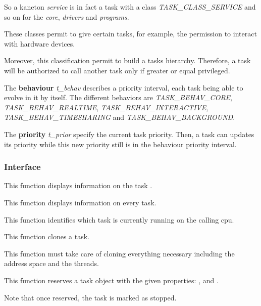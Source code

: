 So a kaneton \textit{service} is in fact a task with a class
\textit{TASK\_CLASS\_SERVICE} and so on for the \textit{core},
\textit{drivers} and \textit{programs}.

These classes permit to give certain tasks, for example, the permission
to interact with hardware devices.

Moreover, this classification permit to build a tasks hierarchy.
Therefore, a task will be authorized to call another task only if
greater or equal privileged.


The \textbf{behaviour} \textit{t\_behav} describes a priority
interval, each task being able to evolve in it by itself. The different
behaviors are \textit{TASK\_BEHAV\_CORE}, \textit{TASK\_BEHAV\_REALTIME},
\textit{TASK\_BEHAV\_INTERACTIVE}, \textit{TASK\_BEHAV\_TIMESHARING}
and \textit{TASK\_BEHAV\_BACKGROUND}.

The \textbf{priority} \textit{t\_prior} specify the current task
priority. Then, a task can updates its priority while this new priority
still is in the behaviour priority interval.

%
%

\subsubsection{Interface}

	 {
	   This function displays information on the task .
	 }

	 {
	   This function displays information on every task.
	 }

	 {
	   This function identifies which task is currently running
	   on the calling cpu.
	 }

	 {
	   This function clones a task.

	   This function must take care of cloning everything necessary
	   including the address space and the threads.
	 }

	 {
	   This function reserves a task object with the given
	   properties: ,  and
	   .

	   Note that once reserved, the task is marked as stopped.

	 }


